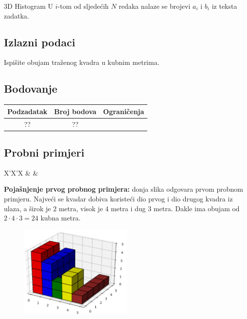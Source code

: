 \begin{statement}[
  problempoints=100,
  timelimit=1 sekunda,
  memorylimit=512 MiB,
]{3D Histogram}
U $i$-tom od sljedećih $N$ redaka nalaze se brojevi $a_i$ i $b_i$ iz
teksta zadatka.

\subsection*{Izlazni podaci}
Ispišite obujam traženog kvadra u kubnim metrima.

\subsection*{Bodovanje}
{\renewcommand{\arraystretch}{1.4}
  \setlength{\tabcolsep}{6pt}
  \begin{tabular}{ccl}
 Podzadatak & Broj bodova & Ograničenja \\ \midrule
  ?? & ?? &  \\
\end{tabular}}

\subsection*{Probni primjeri}
\begin{tabularx}{\textwidth}{X'X'X}
 &
 &
\end{tabularx}

\textbf{Pojašnjenje prvog probnog primjera:} donja slika odgovara prvom
probnom primjeru. Najveći se kvadar dobiva koristeći dio prvog i dio drugog
kvadra iz ulaza, a širok je $2$ metra, visok je $4$ metra i dug $3$ metra. Dakle
ima obujam od $2 \cdot 4 \cdot 3 = 24$ kubna metra.

\begin{figure}[H]
\centering
\includegraphics[width=0.5\textwidth]{img/3dhistogram_skica.png}
\end{figure}

\end{statement}

